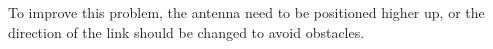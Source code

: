 To improve this problem, the antenna need to be positioned higher up, or the direction of the link should be changed to avoid obstacles.
\newpage
